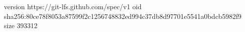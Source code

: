 version https://git-lfs.github.com/spec/v1
oid sha256:80ce78f8053a87599f2c1256748832ed994c37db8d97701e5541a0bdcb5982f9
size 393312
